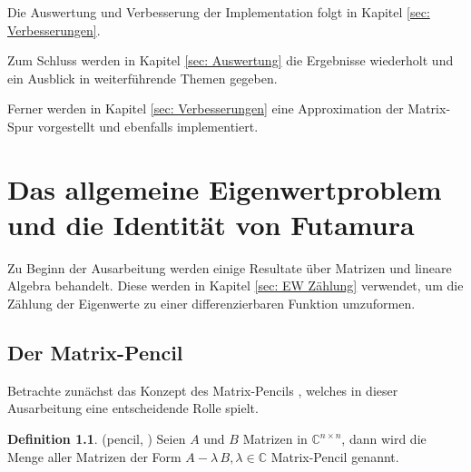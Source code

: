 \documentclass[a4paper,12pt]{report}
\newcommand{\C}{\mathbb C}
\newcommand{\zitat}[1]{\glqq #1\grqq}
\newcommand{\AlamB}{A-\lambda\,B}
\newcommand{\1}{\mathds{1}}
\theoremstyle{plain} %
\theoremstyle{definition} %
\newtheorem{definition}[theorem]{Definition}
\theoremstyle{remark}
\begin{document}

      Die Auswertung und Verbesserung der Implementation folgt in Kapitel \ref{sec: Verbesserungen}.



      Zum Schluss werden in Kapitel \ref{sec: Auswertung} die Ergebnisse wiederholt und ein Ausblick in weiterführende Themen gegeben.

      Ferner werden in Kapitel \ref{sec: Verbesserungen} eine Approximation der Matrix-Spur vorgestellt und ebenfalls implementiert.

\chapter{Das allgemeine Eigenwertproblem und die Identität von Futamura}
\label{sec: EW Problem_Futamura}

      Zu Beginn der Ausarbeitung werden einige Resultate über Matrizen und lineare Algebra behandelt.
      Diese werden in Kapitel \ref{sec: EW Zählung} verwendet, um die Zählung der Eigenwerte zu einer differenzierbaren Funktion umzuformen.
      
      \section{Der Matrix-Pencil}
            Betrachte zunächst das Konzept des \zitat{Matrix-Pencils} \cite[S. 32]{matrixPencilDeutsch}, welches in dieser Ausarbeitung eine entscheidende Rolle spielt.
            \begin{definition}(pencil, \cite[S. 375]{matrixGolub})
                  \label{def: pencil}
                  Seien $A$ und $B$ Matrizen in $\C^{n\times n}$, dann wird die Menge aller Matrizen der Form
                  $\AlamB, \lambda \in \C$ Matrix-Pencil genannt.
            \end{definition}
\end{document}
